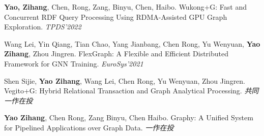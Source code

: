 


\vspace{2mm}

\cvpublication
{\small{\textbf{Yao, Zihang}, Chen, Rong, Zang, Binyu, Chen, Haibo. Wukong+G: Fast and Concurrent RDF Query Processing Using RDMA-Assisted GPU Graph Exploration. \textit{TPDS'2022}}}

\vspace{-2mm}

\cvpublication
{\small{Wang Lei, Yin Qiang, Tian Chao, Yang Jianbang, Chen Rong, Yu Wenyuan, \textbf{Yao Zihang}, Zhou Jingren. FlexGraph: A Flexible and Efficient Distributed Framework for GNN Training. \textit{EuroSys'2021}}}

\vspace{-2mm}

\cvpublication
{\small{Shen Sijie, \textbf{Yao Zihang}, Wang Lei, Chen Rong, Yu Wenyuan, Zhou Jingren. Vegito+G: Hybrid Relational Transaction and Graph Analytical Processing. \textit{共同一作在投}}}


\vspace{-2mm}

\cvpublication
{\small{\textbf{Yao Zihang}, Chen Rong, Zang Binyu, Chen Haibo. Graphy: A Unified System for Pipelined Applications over Graph Data. \textit{一作在投}}}
